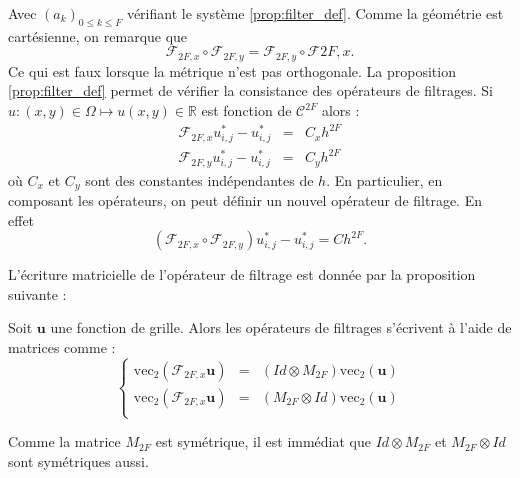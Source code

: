 Avec $(a_k)_{0 \leq k \leq F}$ vérifiant le système \eqref{prop:filter_def}. Comme la géométrie est cartésienne, on remarque que 
\begin{equation}
\mathcal{F}_{2F,x} \circ \mathcal{F}_{2F,y} = \mathcal{F}_{2F,y} \circ \mathcal{F}{2F,x}.
\end{equation}
Ce qui est faux lorsque la métrique n'est pas orthogonale.
La proposition \ref{prop:filter_def} permet de vérifier la consistance des opérateurs de filtrages.
Si $u : (x,y) \in \Omega \mapsto u(x,y) \in \mathbb{R}$ est fonction de $\mathcal{C}^{2F}$ alors :
\begin{eqnarray*}
\mathcal{F}_{2F,x} u^*_{i,j} - u^*_{i,j} & = & C_xh^{2F}\\
\mathcal{F}_{2F,y} u^*_{i,j} - u^*_{i,j} & = & C_yh^{2F}
\end{eqnarray*}
où $C_x$ et $C_y$ sont des constantes indépendantes de $h$.
En particulier, en composant les opérateurs, on peut définir un nouvel opérateur de filtrage. En effet  
\begin{equation}
(\mathcal{F}_{2F,x} \circ \mathcal{F}_{2F,y}) u_{i,j}^* - u_{i,j}^* = Ch^{2F}.
\end{equation}

L'écriture matricielle de l'opérateur de filtrage est donnée par la proposition suivante :
\begin{proposition}
Soit $\mathbf{u}$ une fonction de grille. Alors les opérateurs de filtrages s'écrivent à l'aide de matrices comme :
\begin{equation}
\left\lbrace
\begin{array}{rcl}
\text{vec}_2 (\mathcal{F}_{2F,x} \mathbf{u}) & = & (Id \otimes M_{2F}) \text{vec}_2 (\mathbf{u})\\
\text{vec}_2 (\mathcal{F}_{2F,x} \mathbf{u}) & = & (M_{2F} \otimes Id) \text{vec}_2 (\mathbf{u})\\
\end{array}
\right.
\end{equation}
\end{proposition}
Comme la matrice $M_{2F}$ est symétrique, il est immédiat que $Id \otimes M_{2F}$ et $M_{2F} \otimes Id$ sont symétriques aussi.